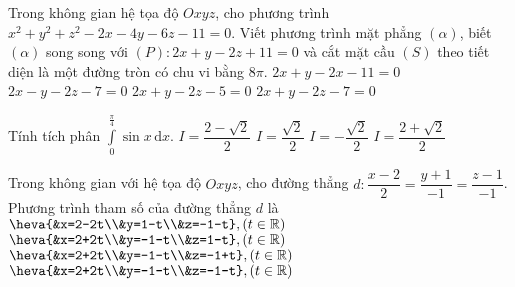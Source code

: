 \begin{ex}%
Trong không gian hệ tọa độ $Oxyz$, cho phương trình $x^2+y^2+z^2-2x-4y-6z-11=0$. Viết phương trình mặt phẳng $(\alpha)$, biết $(\alpha)$ song song với $(P): 2x+y-2z+11=0$ và cắt mặt cầu $(S)$ theo tiết diện là một đường tròn có chu vi bằng $8\pi$.
\choice 
{$2x+y-2x-11=0$}
{$2x-y-2z-7=0$}
{$2x+y-2z-5=0$}
{\True $2x+y-2z-7=0$}
\end{ex}
\begin{ex}%
Tính tích phân $\displaystyle\int\limits_0^{\tfrac{\pi}{4}} \sin{x} \mathrm{\,d}x$.
\choice 
{\True $I=\dfrac{2-\sqrt{2}}{2}$}
{$I=\dfrac{\sqrt{2}}{2}$}
{$I=-\dfrac{\sqrt{2}}{2}$}
{$I=\dfrac{2+\sqrt{2}}{2}$}

\end{ex}
\begin{ex}%
Trong không gian với hệ tọa độ $Oxyz$, cho đường thẳng $d\colon \dfrac{x-2}{2}=\dfrac{y+1}{-1}=\dfrac{z-1}{-1}$. Phương trình tham số của đường thẳng $d$ là
\choice 
{$\heva{&x=2-2t\\&y=1-t\\&z=-1-t}, (t\in \mathbb{R})$}
{\True $\heva{&x=2+2t\\&y=-1-t\\&z=1-t}, (t\in \mathbb{R})$}
{$\heva{&x=2+2t\\&y=-1-t\\&z=-1+t}, (t\in \mathbb{R})$}
{$\heva{&x=2+2t\\&y=-1-t\\&z=-1-t}, (t\in \mathbb{R})$}

\end{ex}
